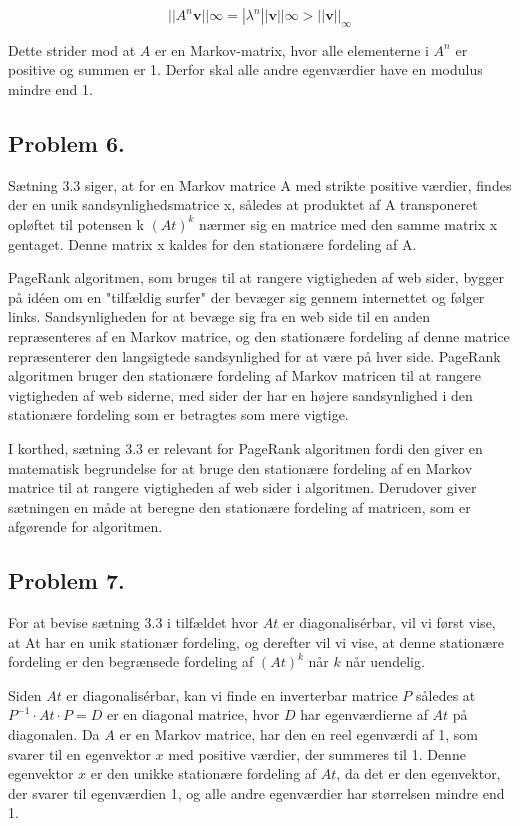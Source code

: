 $$||A^n\mathbf{v}||\infty = |\lambda^n||\mathbf{v}||\infty > ||\mathbf{v}||_\infty$$

Dette strider mod at $A$ er en Markov-matrix, hvor alle elementerne i $A^n$ er positive og summen er 1. Derfor skal alle andre egenværdier have en modulus mindre end 1.


\subsection*{Problem 6.}

Sætning 3.3 siger, at for en Markov matrice A med strikte positive værdier, findes der en unik sandsynlighedsmatrice x, således at produktet af A transponeret opløftet til potensen k $(At)^k$ nærmer sig en matrice med den samme matrix x gentaget. Denne matrix x kaldes for den stationære fordeling af A.

PageRank algoritmen, som bruges til at rangere vigtigheden af web sider, bygger på idéen om en "tilfældig surfer" der bevæger sig gennem internettet og følger links. Sandsynligheden for at bevæge sig fra en web side til en anden repræsenteres af en Markov matrice, og den stationære fordeling af denne matrice repræsenterer den langsigtede sandsynlighed for at være på hver side. PageRank algoritmen bruger den stationære fordeling af Markov matricen til at rangere vigtigheden af web siderne, med sider der har en højere sandsynlighed i den stationære fordeling som er betragtes som mere vigtige.

I korthed, sætning 3.3 er relevant for PageRank algoritmen fordi den giver en matematisk begrundelse for at bruge den stationære fordeling af en Markov matrice til at rangere vigtigheden af web sider i algoritmen. Derudover giver sætningen en måde at beregne den stationære fordeling af matricen, som er afgørende for algoritmen.

\subsection*{Problem 7.}

For at bevise sætning 3.3 i tilfældet hvor $At$ er diagonalisérbar, vil vi først vise, at At har en unik stationær fordeling, og derefter vil vi vise, at denne stationære fordeling er den begrænsede fordeling af $(At)^k$ når $k$ når uendelig.

Siden $At$ er diagonalisérbar, kan vi finde en inverterbar matrice $P$ således at $P^{-1} \cdot At \cdot P = D$ er en diagonal matrice, hvor $D$ har egenværdierne af $At$ på diagonalen.
Da $A$ er en Markov matrice, har den en reel egenværdi af 1, som svarer til en egenvektor $x$ med positive værdier, der summeres til 1. Denne egenvektor $x$ er den unikke stationære fordeling af $At$, da det er den egenvektor, der svarer til egenværdien 1, og alle andre egenværdier har størrelsen mindre end 1.

